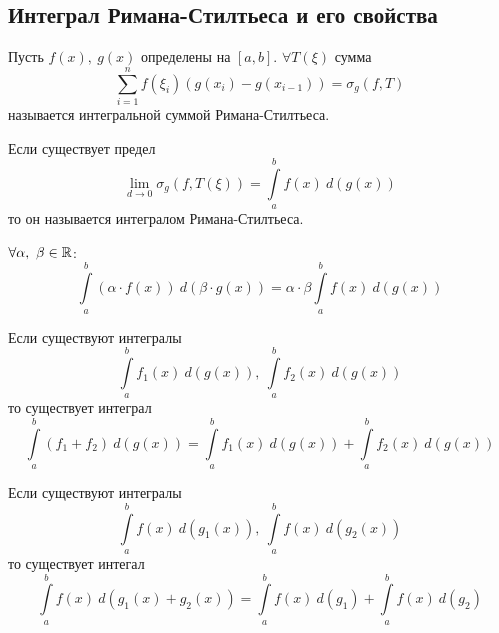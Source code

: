 \subsection{Интеграл Римана-Стилтьеса и его свойства}
\begin{definition}
    Пусть $f(x),\ g(x)$ определены на $[a,b]$. $\forall T(\xi)$ сумма 
    \[\sum\limits_{i=1}^{n} f(\xi_i)(g(x_i)-g(x_{i-1}))=\sigma_g(f,T)\]
    называется интегральной суммой Римана-Стилтьеса.
\end{definition} 
\begin{definition}
    Если существует предел
    \[\lim\limits_{d\to 0}\sigma_g(f, T(\xi))=\int\limits_{a}^{b}f(x)\ d(g(x))\]
    то он называется интегралом Римана-Стилтьеса.
\end{definition}
\begin{numtheorem}
    $\forall \alpha,\ \beta\in \mathbb{R}$:
    \[\int\limits_{a}^{b}(\alpha\cdot f(x))\ d(\beta\cdot g(x))=\alpha \cdot \beta \int\limits_{a}^{b} f(x)\ d(g(x))\]
\end{numtheorem} 
\begin{numtheorem}
    Если существуют интегралы
    \[\int\limits_{a}^{b}f_1(x)\ d(g(x)),\ \int\limits_{a}^{b}f_2(x)\ d(g(x))\]
    то существует интеграл 
    \[\int\limits_{a}^{b}(f_1+f_2)\ d(g(x))=\int\limits_{a}^{b}f_1(x)\ d(g(x))+\int\limits_{a}^{b}f_2(x)\ d(g(x))\]
\end{numtheorem} 
\begin{numtheorem}
    Если существуют интегралы
    \[\int\limits_{a}^{b}f(x)\ d(g_1(x)),\ \int\limits_{a}^{b}f(x)\ d(g_2(x))\]
    то существует интегал 
    \[\int\limits_{a}^{b}f(x)\ d(g_1(x)+g_2(x))=\int\limits_{a}^{b}f(x)\ d(g_1)+\int\limits_{a}^{b}f(x)\ d(g_2)\]
\end{numtheorem} 
